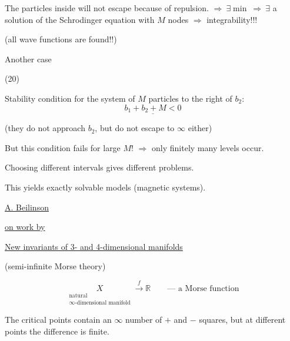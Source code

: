 The particles inside will not escape because of repulsion.
$\Longrightarrow\ \exists\min\ \Longrightarrow\ \exists$ a solution of the Schrodinger equation
with $M$ nodes $\Longrightarrow$ integrability!!!

(all wave functions are found!!)

Another case

(20)
\begin{center}

\end{center}

Stability condition for the system of $M$ particles to the right of $b_2$:
\begin{equation*}
\underline{b_1+b_2+M<0}
\tag{21}
\end{equation*}

(they do not approach $b_2$, but do not escape to $\infty$ either)

But this condition fails for large $M$!
$\Longrightarrow$ only finitely many levels occur.

Choosing different intervals gives different problems.

This yields exactly solvable models (magnetic systems).

\underline{\underline{A. Beilinson}}

\underline{on work by }

\underline{New invariants of 3- and 4-dimensional manifolds}

(semi-infinite Morse theory)

\begin{equation*}
\underset{\substack{\text{natural}\\\infty\text{-dimensional manifold}}}{X}
\overset{f}{\longrightarrow}\mathbb{R}
\qquad\text{--- a Morse function}
\end{equation*}

The critical points contain an $\infty$ number of $+$ and $-$ squares,
but at different points the difference is finite.

